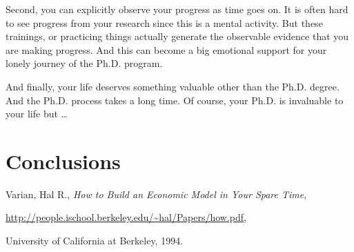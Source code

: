 \documentclass[11pt]{article}
\begin{document}
Second, you can explicitly observe your progress as time goes on. It is often
hard to see progress from your research since this is a mental activity. But
these trainings, or practicing things actually generate the observable
evidence that you are making progress. And this can become a big emotional
support for your lonely journey of the Ph.D. program.

And finally, your life deserves something valuable other than the Ph.D.
degree. And the Ph.D. process takes a long time. Of course, your Ph.D.  is
invaluable to your life but \ldots


\section{Conclusions}




\begin{thebibliography}{99}
Varian, Hal R., \emph{How to Build an Economic Model in Your Spare Time},
\begin{small}\url{http://people.ischool.berkeley.edu/\~hal/Papers/how.pdf},\end{small}
University of California at Berkeley,
1994.


\end{thebibliography}
\end{document}
